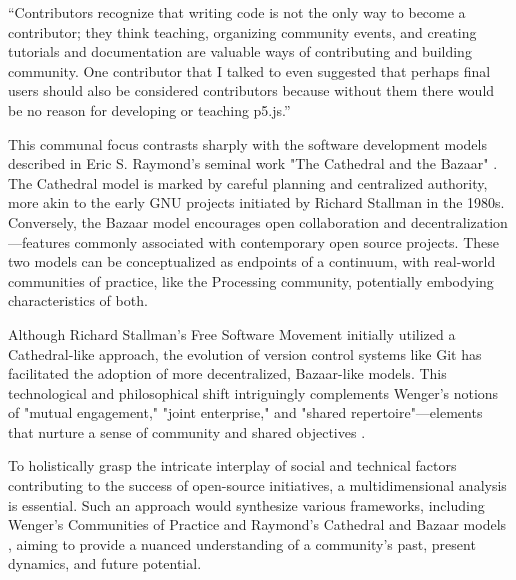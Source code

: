 “Contributors recognize that writing code is not the only way to become a contributor; they think teaching, organizing community events, and creating tutorials and documentation are valuable ways of contributing and building community. One contributor that I talked to even suggested that perhaps final users should also be considered contributors because without them there would be no reason for developing or teaching p5.js.” \parencite[41]{processingfoundation20thAnniversaryProcessing2022}

This communal focus contrasts sharply with the software development models described in Eric S. Raymond's seminal work "The Cathedral and the Bazaar" \parencite{CathedralBazaarMusings2002a}. The Cathedral model is marked by careful planning and centralized authority, more akin to the early GNU projects initiated by Richard Stallman in the 1980s. Conversely, the Bazaar model encourages open collaboration and decentralization—features commonly associated with contemporary open source projects. These two models can be conceptualized as endpoints of a continuum, with real-world communities of practice, like the Processing community, potentially embodying characteristics of both.

Although Richard Stallman's Free Software Movement initially utilized a Cathedral-like approach, the evolution of version control systems like Git has facilitated the adoption of more decentralized, Bazaar-like models. This technological and philosophical shift intriguingly complements Wenger's notions of "mutual engagement," "joint enterprise," and "shared repertoire"—elements that nurture a sense of community and shared objectives \parencite{wengerCommunitiesPracticeLearning1998}.

To holistically grasp the intricate interplay of social and technical factors contributing to the success of open-source initiatives, a multidimensional analysis is essential. Such an approach would synthesize various frameworks, including Wenger's Communities of Practice \parencite{wengerCommunitiesPracticeLearning1998} and Raymond's Cathedral and Bazaar models \parencite{CathedralBazaarMusings2002a}, aiming to provide a nuanced understanding of a community's past, present dynamics, and future potential.


